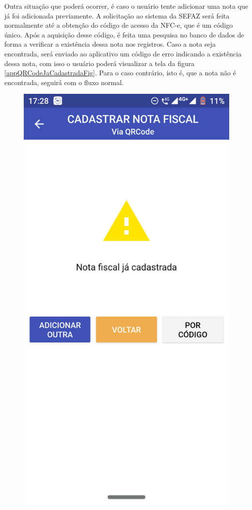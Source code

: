 \newpage
Outra situação que poderá ocorrer, é caso o usuário tente adicionar uma nota que já foi adicionada previamente. A solicitação ao sistema da SEFAZ será feita normalmente até a obtenção do código de acesso da NFC-e, que é um código único. Após a aquisição desse código, é feita uma pesquisa no banco de dados de forma a verificar a existência dessa nota nos registros. Caso a nota seja encontrada, será enviado ao aplicativo um código de erro indicando a existência dessa nota, com isso o usuário poderá visualizar a tela da figura \ref{appQRCodeJaCadastradaFig}. Para o caso contrário, isto é, que a nota não é encontrada, seguirá com o fluxo normal.

\begin{figure}[h]
    \centering
    \includegraphics[scale=0.15]{tcc/figures/app/app_codigo_qrcode_ja_cadastrada.png}

\end{figure}
